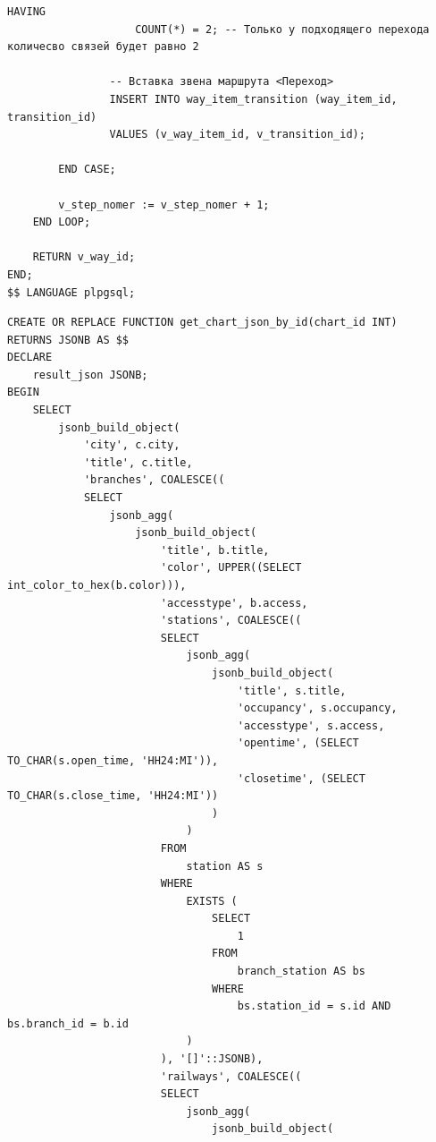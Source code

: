 \clearpage

\begin{lstlisting}[label=lst:add_route_json:4,caption=Реализация функции добавления маршрута (часть 4),firstnumber=187]
                HAVING
                    COUNT(*) = 2; -- Только у подходящего перехода количесво связей будет равно 2

                -- Вставка звена маршрута <Переход>
                INSERT INTO way_item_transition (way_item_id, transition_id)
                VALUES (v_way_item_id, v_transition_id);

        END CASE;

        v_step_nomer := v_step_nomer + 1;
    END LOOP;

    RETURN v_way_id;
END;
$$ LANGUAGE plpgsql;
\end{lstlisting}

\begin{lstlisting}[label=lst:get_chart_json_by_id:1,caption=Реализация функции получения схемы (часть 1),firstnumber=1]
CREATE OR REPLACE FUNCTION get_chart_json_by_id(chart_id INT)
RETURNS JSONB AS $$
DECLARE
    result_json JSONB;
BEGIN
    SELECT
        jsonb_build_object(
            'city', c.city,
            'title', c.title,
            'branches', COALESCE((
            SELECT
                jsonb_agg(
                    jsonb_build_object(
                        'title', b.title,
                        'color', UPPER((SELECT int_color_to_hex(b.color))),
                        'accesstype', b.access,
                        'stations', COALESCE((
                        SELECT
                            jsonb_agg(
                                jsonb_build_object(
                                    'title', s.title,
                                    'occupancy', s.occupancy,
                                    'accesstype', s.access,
                                    'opentime', (SELECT TO_CHAR(s.open_time, 'HH24:MI')),
                                    'closetime', (SELECT TO_CHAR(s.close_time, 'HH24:MI'))
                                )
                            )
                        FROM
                            station AS s
                        WHERE
                            EXISTS (
                                SELECT
                                    1
                                FROM
                                    branch_station AS bs
                                WHERE
                                    bs.station_id = s.id AND bs.branch_id = b.id
                            )
                        ), '[]'::JSONB),
                        'railways', COALESCE((
                        SELECT
                            jsonb_agg(
                                jsonb_build_object(
\end{lstlisting}


